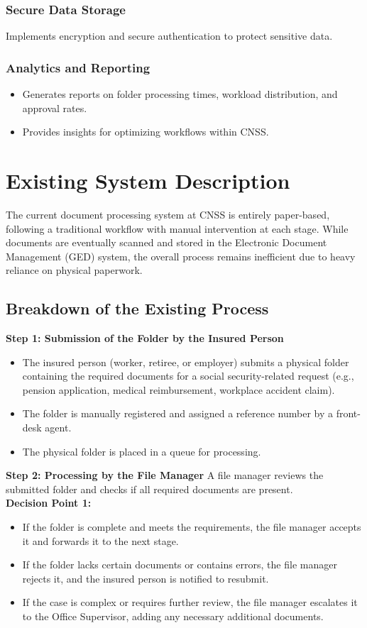 \subsubsection{ Secure Data Storage}
Implements encryption and secure authentication to protect sensitive data.
\subsubsection{ Analytics and Reporting}
\begin{itemize}
    \item Generates reports on folder processing times, workload distribution, and approval rates.
    \item Provides insights for optimizing workflows within CNSS.
\end{itemize}


\section{Existing System Description}
The current document processing system at CNSS is entirely paper-based, following a traditional workflow with manual intervention at each stage. While documents are eventually scanned and stored in the Electronic Document Management (GED) system, the overall process remains inefficient due to heavy reliance on physical paperwork.
\subsection{Breakdown of the Existing Process}
\textbf{ Step 1: Submission of the Folder by the Insured Person}
\begin{itemize}
    \item The insured person (worker, retiree, or employer) submits a physical folder containing the required documents for a social security-related request (e.g., pension application, medical reimbursement, workplace accident claim).
    \item The folder is manually registered and assigned a reference number by a front-desk agent.
    \item The physical folder is placed in a queue for processing.
\end{itemize}

 \textbf{ Step 2: Processing by the File Manager}
A file manager reviews the submitted folder and checks if all required documents are present.\\
\textbf{Decision Point 1:}
\begin{itemize}
    \item If the folder is complete and meets the requirements, the file manager accepts it and forwards it to the next stage.
    \item If the folder lacks certain documents or contains errors, the file manager rejects it, and the insured person is notified to resubmit.
    \item If the case is complex or requires further review, the file manager escalates it to the Office Supervisor, adding any necessary additional documents.
\end{itemize}


